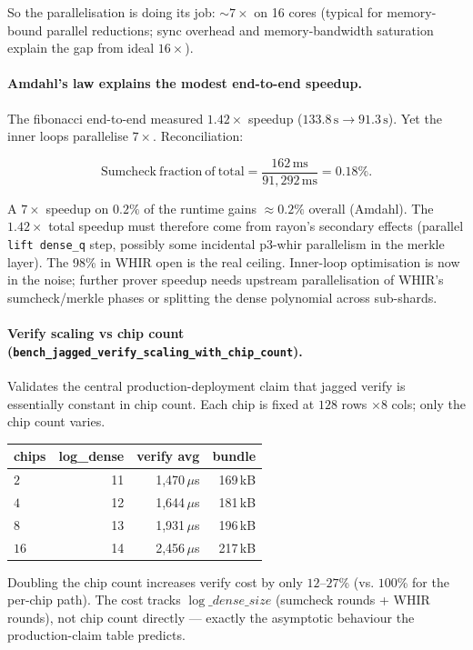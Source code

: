 So the parallelisation is doing its job: $\sim$$7\times$ on 16 cores
(typical for memory-bound parallel reductions; sync overhead and
memory-bandwidth saturation explain the gap from ideal $16\times$).

\paragraph{Amdahl's law explains the modest end-to-end speedup.}
The fibonacci end-to-end measured $1.42\times$ speedup
($133.8\,\mathrm{s} \to 91.3\,\mathrm{s}$).  Yet the inner loops
parallelise $7\times$.  Reconciliation:

\[
  \mathrm{Sumcheck\ fraction\ of\ total} =
  \frac{162\,\mathrm{ms}}{91{,}292\,\mathrm{ms}} = 0.18\%.
\]

A $7\times$ speedup on $0.2\%$ of the runtime gains
$\approx 0.2\%$ overall (Amdahl).  The $1.42\times$ total speedup
must therefore come from rayon's secondary effects (parallel
\texttt{lift dense\_q} step, possibly some incidental p3-whir
parallelism in the merkle layer).  The 98\% in WHIR open is the
real ceiling.  Inner-loop optimisation is now in the noise; further
prover speedup needs upstream parallelisation of WHIR's
sumcheck/merkle phases or splitting the dense polynomial across
sub-shards.

\paragraph{Verify scaling vs chip count
(\texttt{bench\_jagged\_verify\_scaling\_with\_chip\_count}).}
Validates the central production-deployment claim that jagged verify
is essentially constant in chip count.  Each chip is fixed at $128$
rows $\times 8$ cols; only the chip count varies.

\begin{tabular}{lrrr}
\toprule
\textbf{chips} & \textbf{log\_dense} & \textbf{verify avg} & \textbf{bundle} \\
\midrule
$2$  & 11 & 1{,}470\,$\mu$s & 169\,kB \\
$4$  & 12 & 1{,}644\,$\mu$s & 181\,kB \\
$8$  & 13 & 1{,}931\,$\mu$s & 196\,kB \\
$16$ & 14 & 2{,}456\,$\mu$s & 217\,kB \\
\bottomrule
\end{tabular}

Doubling the chip count increases verify cost by only $12$--$27$\%
(vs. $100$\% for the per-chip path).  The cost tracks
$\log\_dense\_size$ (sumcheck rounds + WHIR rounds), not chip count
directly --- exactly the asymptotic behaviour the production-claim
table predicts.


